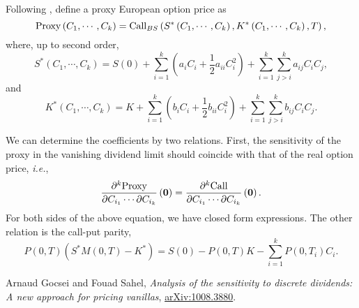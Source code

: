 \documentclass[12pt]{article}
\begin{document}
  Following \cite{GS}, define a proxy European option price as
  \begin{equation}
    {\rm Proxy}\left(C_1,\cdots, C_k\right)
    = {\rm Call}_{BS}\left(S^*\left(C_1,\cdots, C_k\right), K^*\left(C_1,\cdots, C_k\right), T\right),
  \end{equation}
  where, up to second order,
  \begin{equation}
    S^*\left(C_1,\cdots, C_k\right) = S(0) + \sum_{i=1}^k\left(a_iC_i+\frac{1}{2}a_{ii}C_i^2\right)
                                    + \sum_{i=1}^k\sum_{j>i}^ka_{ij}C_iC_j,
  \end{equation}
  and
  \begin{equation}
    K^*\left(C_1,\cdots, C_k\right) = K    + \sum_{i=1}^k\left(b_iC_i+\frac{1}{2}b_{ii}C_i^2\right)
                                    + \sum_{i=1}^k\sum_{j>i}^kb_{ij}C_iC_j.
  \end{equation}

  We can determine the coefficients by two relations. First, the sensitivity of the proxy in the vanishing
  dividend limit should coincide with that of the real option price, {\it i.e.},
  \begin{equation}
    \frac{\partial^k{\rm Proxy}}{\partial C_{i_1}\cdots\partial C_{i_k}}\left({\bf 0}\right)
    =\frac{\partial^k{\rm Call}}{\partial C_{i_1}\cdots\partial C_{i_k}}\left({\bf 0}\right).
  \end{equation}
  For both sides of the above equation, we have closed form expressions. The other relation is the call-put
  parity,
  \begin{equation}
    P(0,T)\left(S^*M(0,T)-K^*\right)=S(0) - P(0,T) K - \sum_{i=1}^k P(0,T_i)C_i.
  \end{equation}


\begin{thebibliography}{99}
    Arnaud Gocsei and Fouad Sahel,
    {\it Analysis of the sensitivity to discrete dividends: A new approach for pricing vanillas},
    \href{https://arxiv.org/pdf/1008.3880.pdf}{arXiv:1008.3880}.
\end{thebibliography}
\end{document}
